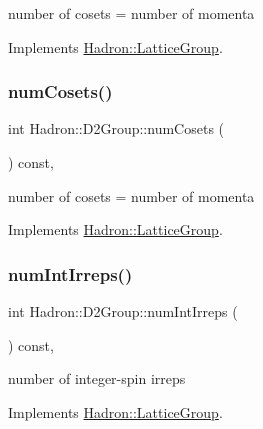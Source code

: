 number of cosets = number of momenta 

Implements \mbox{\hyperlink{structHadron_1_1LatticeGroup_afc76430f36a3a041f86d4058c59bf55e}{Hadron\+::\+Lattice\+Group}}.

\mbox{\label{structHadron_1_1D2Group_a1f8a4f5adef5a9a05edd39f14d21f1cd}} 
\subsubsection{\texorpdfstring{numCosets()}{numCosets()}\hspace{0.1cm}{\footnotesize\ttfamily [3/3]}}
{\footnotesize\ttfamily int Hadron\+::\+D2\+Group\+::num\+Cosets (\begin{DoxyParamCaption}{ }\end{DoxyParamCaption}) const\hspace{0.3cm}{\ttfamily [inline]}, {\ttfamily [virtual]}}

number of cosets = number of momenta 

Implements \mbox{\hyperlink{structHadron_1_1LatticeGroup_afc76430f36a3a041f86d4058c59bf55e}{Hadron\+::\+Lattice\+Group}}.

\mbox{\label{structHadron_1_1D2Group_a15d5aa6a889d3e0f27c3f2796d7157ae}} 
\subsubsection{\texorpdfstring{numIntIrreps()}{numIntIrreps()}\hspace{0.1cm}{\footnotesize\ttfamily [1/3]}}
{\footnotesize\ttfamily int Hadron\+::\+D2\+Group\+::num\+Int\+Irreps (\begin{DoxyParamCaption}{ }\end{DoxyParamCaption}) const\hspace{0.3cm}{\ttfamily [inline]}, {\ttfamily [virtual]}}

number of integer-\/spin irreps 

Implements \mbox{\hyperlink{structHadron_1_1LatticeGroup_af2aa7b39222bf188389356eefcef7547}{Hadron\+::\+Lattice\+Group}}.

\mbox{\label{structHadron_1_1D2Group_a15d5aa6a889d3e0f27c3f2796d7157ae}} 

